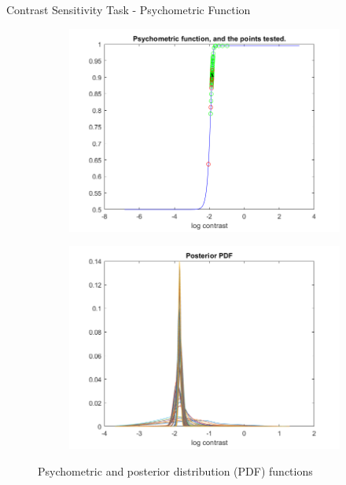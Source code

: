 \documentclass[10pt,xcolor=svgnames]{beamer} %
\begin{document}
\begin{frame}{Contrast Sensitivity Task - Psychometric Function}
    \begin{figure}
        \centering
        \begin{subfigure}{0.4\textwidth}
        \centering
            \includegraphics[width=1.2\textwidth]{pictures/thrExp_PC.png}
        \end{subfigure}
        \hfill
        \begin{subfigure}{0.4\textwidth}
            \centering
            \includegraphics[width=1.2\textwidth]{pictures/thrExp_pdf.png}
        \end{subfigure}
        \label{fig:psychometric_pdf}
        \caption{Psychometric and posterior distribution (PDF) functions}
    \end{figure}


\end{frame}
\end{document}
